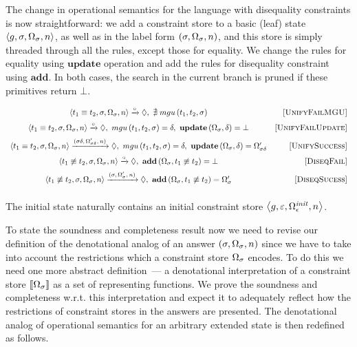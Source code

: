 The change in operational semantics for the language with disequality constraints is now straightforward: we add a constraint store to a basic (leaf) state $\left<{g, \sigma, \Omega_\sigma, n}\right>$,
as well as in the label form $(\sigma, \Omega_\sigma, n)$, and this store is simply threaded through all the rules, except those for equality. We change the rules
for equality using $\mathbf{update}$ operation and add the rules for disequality constraint using $\mathbf{add}$. In both cases, the search in the current branch is
pruned if these primitives return $\bot$.

 \[
  \begin{array}{cr}
    \left<{t_1 \equiv t_2, \sigma, \Omega_\sigma, n}\right> \xrightarrow{\circ} \Diamond , \, \, \nexists\; mgu\,(t_1, t_2, \sigma) &\mbox{[\textsc{UnifyFailMGU}]} \\[2mm]
    \left<{t_1 \equiv t_2, \sigma, \Omega_\sigma, n}\right> \xrightarrow{\circ} \Diamond , \, \, mgu\,(t_1, t_2, \sigma) = \delta, \, \, \mathbf{update}\,(\Omega_\sigma, \delta) = \bot &\mbox{[\textsc{UnifyFailUpdate}]} \\[2mm]
    \left<{t_1 \equiv t_2, \sigma, \Omega_\sigma, n}\right> \xrightarrow{(\sigma \delta, \, \Omega'_{\sigma\delta}, \, n)} \Diamond , \, \, mgu\,(t_1, t_2, \sigma) = \delta, \, \, \mathbf{update}\,(\Omega_\sigma, \delta) = \Omega'_{\sigma\delta} & \mbox{[\textsc{UnifySuccess}]} \\[2mm]
    \left<{t_1 \not\equiv t_2, \sigma, \Omega_\sigma, n}\right> \xrightarrow{\circ} \Diamond , \, \, \mathbf{add}\,(\Omega_\sigma, t_1 \not\equiv t_2) = \bot &\mbox{[\textsc{DiseqFail}]} \\[2mm]
    \left<{t_1 \not\equiv t_2, \sigma, \Omega_\sigma, n}\right> \xrightarrow{(\sigma, \, \Omega'_{\sigma}, \, n)} \Diamond , \, \, \mathbf{add}\,(\Omega_\sigma, t_1 \not\equiv t_2) = \Omega'_\sigma &\mbox{[\textsc{DiseqSucess}]} \\[2mm]
  \end{array}
\]

The initial state naturally contains an initial constraint store $\left<{g, \varepsilon, \Omega_\epsilon^{\mathit{init}}, n}\right>$.

To state the soundness and completeness result now we need to revise our definition of the denotational analog of an answer $(\sigma, \Omega_\sigma, n)$
since we have to take into account the restrictions which a constraint store $\Omega_\sigma$ encodes.
To do this we need one more abstract definition~--- a denotational interpretation of a constraint store $\llbracket{\Omega_\sigma}\rrbracket$ as a set of representing functions.
We prove the soundness and completeness w.r.t. this interpretation and expect it to adequately reflect how the restrictions of constraint stores in the answers are presented.
The denotational analog of operational semantics for an arbitrary extended state is then redefined as follows.

